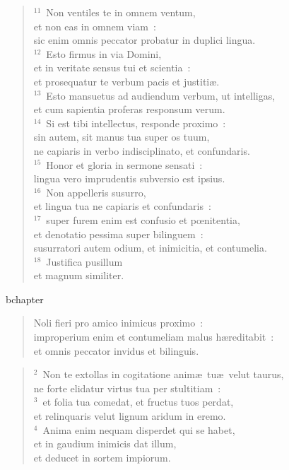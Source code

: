 \begin{verse}${}^{11}$~Non ventiles te in omnem ventum,\\ et non eas in omnem viam~:\\ sic enim omnis peccator probatur in duplici lingua.\\
${}^{12}$~Esto firmus in via Domini,\\ et in veritate sensus tui et scientia~:\\ et prosequatur te verbum pacis et justiti\ae .\\
${}^{13}$~Esto mansuetus ad audiendum verbum, ut intelligas,\\ et cum sapientia proferas responsum verum.\\
${}^{14}$~Si est tibi intellectus, responde proximo~:\\ sin autem, sit manus tua super os tuum,\\ ne capiaris in verbo indisciplinato, et confundaris.\\
${}^{15}$~Honor et gloria in sermone sensati~:\\ lingua vero imprudentis subversio est ipsius.\\
${}^{16}$~Non appelleris susurro,\\ et lingua tua ne capiaris et confundaris~:\\
${}^{17}$~super furem enim est confusio et pœnitentia,\\ et denotatio pessima super bilinguem~:\\ susurratori autem odium, et inimicitia, et contumelia.\\
${}^{18}$~Justifica pusillum\\ et magnum similiter.\end{verse}


bchapter\begin{verse}\vspace{-19pt}Noli fieri pro amico inimicus proximo~:\\ improperium enim et contumeliam malus h\ae reditabit~:\\ et omnis peccator invidus et bilinguis.\end{verse}


\begin{verse}${}^{2}$~Non te extollas in cogitatione anim\ae\ tu\ae\ velut taurus,\\ ne forte elidatur virtus tua per stultitiam~:\\
${}^{3}$~et folia tua comedat, et fructus tuos perdat,\\ et relinquaris velut lignum aridum in eremo.\\
${}^{4}$~Anima enim nequam disperdet qui se habet,\\ et in gaudium inimicis dat illum,\\ et deducet in sortem impiorum.\end{verse}


